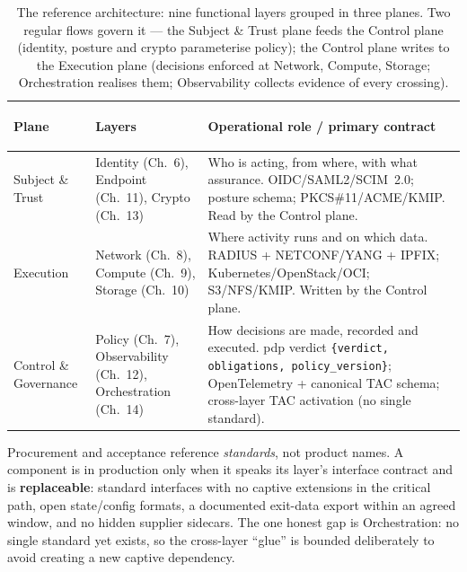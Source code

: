 \documentclass[11pt,a4paper,twoside]{article}
\newcommand{\keyword}[1]{\textbf{#1}}
\begin{document}
\begin{table}[h!]
\centering\small
\renewcommand{\arraystretch}{1.15}
\begin{tabularx}{\textwidth}{
  >{\bfseries\raggedright\arraybackslash}p{3.0cm}
  >{\raggedright\arraybackslash}p{3.3cm}
  >{\raggedright\arraybackslash}X}
\toprule
\textbf{Plane} & \textbf{Layers} & \textbf{Operational role / primary contract} \\
\midrule
Subject \& Trust &
  Identity (Ch.~6), Endpoint (Ch.~11), Crypto (Ch.~13) &
  Who is acting, from where, with what assurance. OIDC/SAML2/SCIM~2.0;
  posture schema; PKCS\#11/ACME/KMIP. Read by the Control plane. \\
\addlinespace
Execution &
  Network (Ch.~8), Compute (Ch.~9), Storage (Ch.~10) &
  Where activity runs and on which data. RADIUS + NETCONF/YANG + IPFIX;
  Kubernetes/OpenStack/OCI; S3/NFS/KMIP. Written by the Control plane. \\
\addlinespace
Control \& Governance &
  Policy (Ch.~7), Observability (Ch.~12), Orchestration (Ch.~14) &
  How decisions are made, recorded and executed. \gls{pdp} verdict
  \texttt{\{verdict, obligations, policy\_version\}}; OpenTelemetry +
  canonical TAC schema; cross-layer TAC activation (no single standard). \\
\bottomrule
\end{tabularx}
\caption{The reference architecture: nine functional layers grouped in three
planes. Two regular flows govern it --- the Subject \& Trust plane feeds the
Control plane (identity, posture and crypto parameterise policy); the Control
plane writes to the Execution plane (decisions enforced at Network, Compute,
Storage; Orchestration realises them; Observability collects evidence of every
crossing).}
\end{table}

\begin{principlebox}
Procurement and acceptance reference \emph{standards}, not product names. A
component is in production only when it speaks its layer's interface contract
and is \keyword{replaceable}: standard interfaces with no captive extensions
in the critical path, open state/config formats, a documented exit-data
export within an agreed window, and no hidden supplier sidecars. The one
honest gap is Orchestration: no single standard yet exists, so the
cross-layer ``glue'' is bounded deliberately to avoid creating a new captive
dependency.
\end{principlebox}
\end{document}
